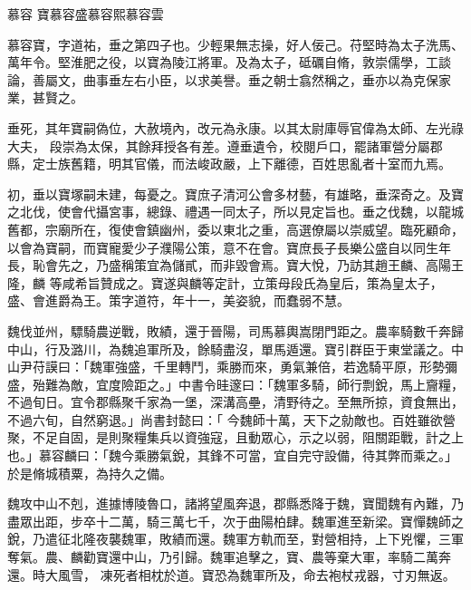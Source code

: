 
\begin{pinyinscope}

 慕容
 寶慕容盛慕容熙慕容雲



 慕容寶，字道祐，垂之第四子也。少輕果無志操，好人佞己。苻堅時為太子洗馬、萬年令。堅淮肥之役，以寶為陵江將軍。及為太子，砥礪自脩，敦崇儒學，工談論，善屬文，曲事垂左右小臣，以求美譽。垂之朝士翕然稱之，垂亦以為克保家業，甚賢之。



 垂死，其年寶嗣偽位，大赦境內，改元為永康。以其太尉庫辱官偉為太師、左光祿大夫，
 段崇為太保，其餘拜授各有差。遵垂遺令，校閱戶口，罷諸軍營分屬郡縣，定士族舊籍，明其官儀，而法峻政嚴，上下離德，百姓思亂者十室而九焉。



 初，垂以寶塚嗣未建，每憂之。寶庶子清河公會多材藝，有雄略，垂深奇之。及寶之北伐，使會代攝宮事，總錄、禮遇一同太子，所以見定旨也。垂之伐魏，以龍城舊都，宗廟所在，復使會鎮幽州，委以東北之重，高選僚屬以崇威望。臨死顧命，以會為寶嗣，而寶寵愛少子濮陽公策，意不在會。寶庶長子長樂公盛自以同生年長，恥會先之，乃盛稱策宜為儲貳，而非毀會焉。寶大悅，乃訪其趙王麟、高陽王隆，麟
 等咸希旨贊成之。寶遂與麟等定計，立策母段氏為皇后，策為皇太子，盛、會進爵為王。策字道符，年十一，美姿貌，而蠢弱不慧。



 魏伐並州，驃騎農逆戰，敗績，還于晉陽，司馬慕輿嵩閉門距之。農率騎數千奔歸中山，行及潞川，為魏追軍所及，餘騎盡沒，單馬遁還。寶引群臣于東堂議之。中山尹苻謨曰：「魏軍強盛，千里轉鬥，乘勝而來，勇氣兼倍，若逸騎平原，形勢彌盛，殆難為敵，宜度險距之。」中書令晆邃曰：「魏軍多騎，師行剽銳，馬上齎糧，不過旬日。宜令郡縣聚千家為一堡，深溝高壘，清野待之。至無所掠，資食無出，不過六旬，自然窮退。」尚書封懿曰：「
 今魏師十萬，天下之勍敵也。百姓雖欲營聚，不足自固，是則聚糧集兵以資強寇，且動眾心，示之以弱，阻關距戰，計之上也。」慕容麟曰：「魏今乘勝氣銳，其鋒不可當，宜自完守設備，待其弊而乘之。」於是脩城積粟，為持久之備。



 魏攻中山不剋，進據博陵魯口，諸將望風奔退，郡縣悉降于魏，寶聞魏有內難，乃盡眾出距，步卒十二萬，騎三萬七千，次于曲陽柏肆。魏軍進至新梁。寶憚魏師之銳，乃遣征北隆夜襲魏軍，敗績而還。魏軍方軌而至，對營相持，上下兇懼，三軍奪氣。農、麟勸寶還中山，乃引歸。魏軍追擊之，寶、農等棄大軍，率騎二萬奔還。時大風雪，
 凍死者相枕於道。寶恐為魏軍所及，命去袍杖戎器，寸刃無返。




\end{pinyinscope}
